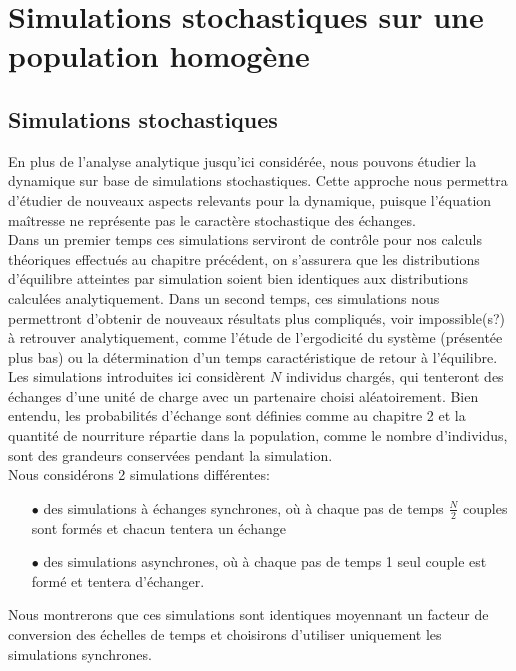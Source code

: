 \chapter{Simulations stochastiques sur une population homogène}
\section{Simulations stochastiques}
En plus de l'analyse analytique jusqu'ici considérée, nous pouvons étudier la dynamique sur base de simulations stochastiques. Cette approche nous permettra d'étudier de nouveaux aspects relevants pour la dynamique, puisque l'équation maîtresse ne représente pas le caractère stochastique des échanges.\\

Dans un premier temps ces simulations serviront de contrôle pour nos calculs théoriques effectués au chapitre précédent, on s'assurera que les distributions d'équilibre atteintes par simulation soient bien identiques aux distributions calculées analytiquement. Dans un second temps, ces simulations nous permettront d'obtenir de nouveaux résultats plus compliqués, voir impossible(s?) à retrouver analytiquement, comme l'étude de l'ergodicité du système (présentée plus bas) ou la détermination d'un temps caractéristique de retour à l'équilibre.\\

Les simulations introduites ici considèrent $N$ individus chargés, qui tenteront des échanges d'une unité de charge avec un partenaire choisi aléatoirement. Bien entendu, les probabilités d'échange sont définies comme au chapitre 2 et la quantité de nourriture répartie dans la population, comme le nombre d'individus, sont des grandeurs conservées pendant la simulation.\\

Nous considérons 2 simulations différentes:
\begin{itemize}
\item[$\bullet$] des simulations à échanges synchrones, où à chaque pas de temps $\frac{N}{2}$ couples sont formés et chacun tentera un échange
\item[$\bullet$] des simulations asynchrones, où à chaque pas de temps 1 seul couple est formé et tentera d'échanger.\\
\end{itemize}

Nous montrerons que ces simulations sont identiques moyennant un facteur de conversion des échelles de temps et choisirons d'utiliser uniquement les simulations synchrones.\\


